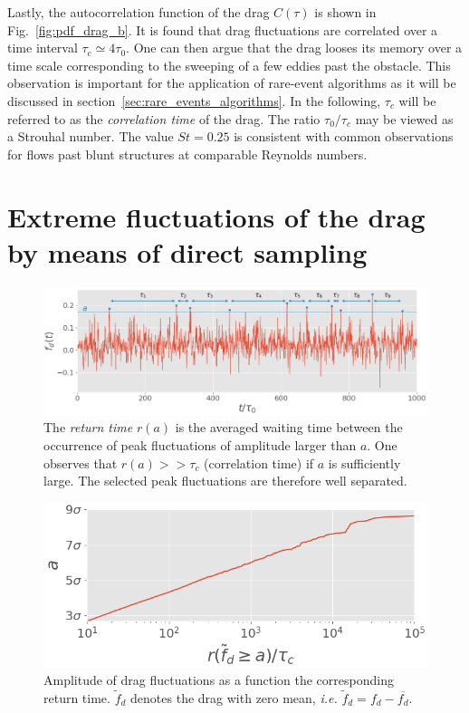 \documentclass[pre,aps,floatfix,10pt,superscriptaddress, notitlepage,preprint]{revtex4-1}
\begin{document}
Lastly, the autocorrelation function of the drag $C(\tau)$ is shown in Fig.~\ref{fig:pdf_drag_b}. It is found that drag fluctuations are correlated over a time interval $\tau_c \simeq 4\tau_0$. One can then argue that the drag looses its memory  over a time scale corresponding to the sweeping of a few eddies past the obstacle.
%
This observation is important for the application of rare-event algorithms as it  will be discussed in section~\ref{sec:rare_events_algorithms}.
%
In the following, $\tau_c$ will be referred to as the \textit{correlation time} of the drag. The ratio $\tau_0 / \tau_c$ may be viewed as a {Strouhal number}. The value $St=0.25$ is consistent with common observations for flows past blunt structures at comparable Reynolds numbers.

\section{Extreme fluctuations of the drag by means of direct sampling}
\label{sec:direct_sampling}

\begin{figure}
	\centering
	\includegraphics[width=\linewidth]{illustrate_return_time/illustrate_return_time}
	\caption{\label{fig:illustrate_return_time} {The \textit{return time} $r(a)$  is the averaged waiting time between the occurrence of peak fluctuations of amplitude larger than $a$.
	One observes that $r(a) >> \tau_c$ (correlation time) if $a$ is sufficiently large. The selected peak fluctuations are therefore well separated.}
	}
\end{figure}

\begin{figure}
	\centering
	\includegraphics[width=.6\linewidth]{return_time/return_time.png}
	\caption{Amplitude of drag fluctuations as a function the corresponding return time. $\tilde{f}_d$ denotes the drag with zero mean, \textit{i.e.} $\tilde{f}_d = f_d - \overline{f_d}$.
	}
	\label{fig:return_time_instant}
\end{figure}
\end{document}
